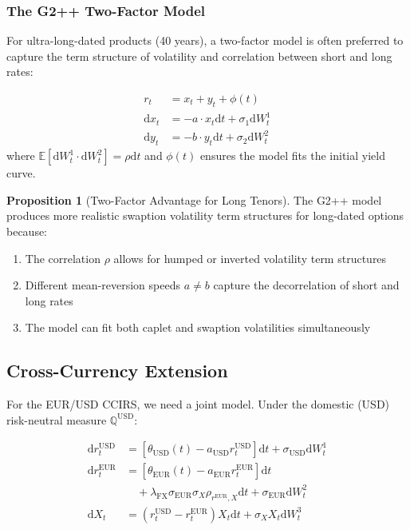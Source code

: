 \documentclass[conference]{IEEEtran}
\theoremstyle{definition}
\newtheorem{proposition}{Proposition}[section]
\newcommand{\E}{\mathbb{E}}
\newcommand{\Q}{\mathbb{Q}}
\newcommand{\diff}{\mathrm{d}}
\begin{document}
\subsubsection{The G2++ Two-Factor Model}

For ultra-long-dated products (40 years), a two-factor model is often preferred to capture the term structure of volatility and correlation between short and long rates:

\begin{align}
r_t &= x_t + y_t + \phi(t) \\
\diff x_t &= -a \cdot x_t \diff t + \sigma_1 \diff W^1_t \\
\diff y_t &= -b \cdot y_t \diff t + \sigma_2 \diff W^2_t
\end{align}
where $\E[\diff W^1_t \cdot \diff W^2_t] = \rho \diff t$ and $\phi(t)$ ensures the model fits the initial yield curve.

\begin{proposition}[Two-Factor Advantage for Long Tenors]
The G2++ model produces more realistic swaption volatility term structures for long-dated options because:
\begin{enumerate}
    \item The correlation $\rho$ allows for humped or inverted volatility term structures
    \item Different mean-reversion speeds $a \neq b$ capture the decorrelation of short and long rates
    \item The model can fit both caplet and swaption volatilities simultaneously
\end{enumerate}
\end{proposition}

\subsection{Cross-Currency Extension}

For the EUR/USD CCIRS, we need a joint model. Under the domestic (USD) risk-neutral measure $\Q^{\text{USD}}$:

\begin{align}
\diff r^{\text{USD}}_t &= [\theta_{\text{USD}}(t) - a_{\text{USD}} r^{\text{USD}}_t] \diff t + \sigma_{\text{USD}} \diff W^{1}_t \\
\diff r^{\text{EUR}}_t &= [\theta_{\text{EUR}}(t) - a_{\text{EUR}} r^{\text{EUR}}_t] \diff t \nonumber\\
&\quad + \lambda_{\text{FX}} \sigma_{\text{EUR}} \sigma_X \rho_{r^{\text{EUR}},X}\diff t
 + \sigma_{\text{EUR}} \diff W^{2}_t \\
\diff X_t &= (r^{\text{USD}}_t - r^{\text{EUR}}_t) X_t \diff t + \sigma_X X_t \diff W^{3}_t
\end{align}
\end{document}
